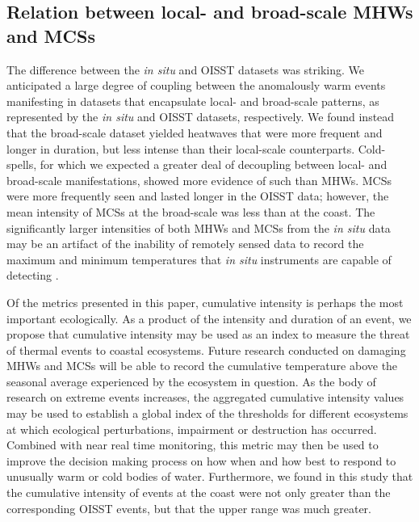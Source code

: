 \documentclass[a4paper,10pt,review]{elsarticle}
\begin{document}
\subsection{Relation between local- and broad-scale MHWs and MCSs}
The difference between the \emph{in situ} and OISST datasets was striking. We anticipated a large degree of coupling between the anomalously warm events manifesting in datasets that encapsulate local- and broad-scale patterns, as represented by the \emph{in situ} and OISST datasets, respectively. We found instead that the broad-scale dataset yielded heatwaves that were more frequent and longer in duration, but less intense than their local-scale counterparts. Cold-spells, for which we expected a greater deal of decoupling between local- and broad-scale manifestations, showed more evidence of such than MHWs. MCSs were more frequently seen and lasted longer in the OISST data; however, the mean intensity of MCSs at the broad-scale was less than at the coast. The significantly larger intensities of both MHWs and MCSs from the \emph{in situ} data may be an artifact of the inability of remotely sensed data to record the maximum and minimum temperatures that \emph{in situ} instruments are capable of detecting \citep{Smale2009}.

Of the metrics presented in this paper, cumulative intensity is perhaps the most important ecologically. As a product of the intensity and duration of an event, we propose that cumulative intensity may be used as an index to measure the threat of thermal events to coastal ecosystems. Future research conducted on damaging MHWs and MCSs will be able to record the cumulative temperature above the seasonal average experienced by the ecosystem in question. As the body of research on extreme events increases, the aggregated cumulative intensity values may be used to establish a global index of the thresholds for different ecosystems at which ecological perturbations, impairment or destruction has occurred. Combined with near real time monitoring, this metric may then be used to improve the decision making process on how when and how best to respond to unusually warm or cold bodies of water. Furthermore, we found in this study that the cumulative intensity of events at the coast were not only greater than the corresponding OISST events, but that the upper range was much greater.
\end{document}
